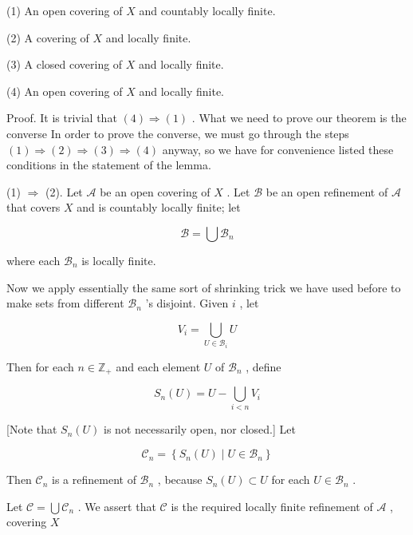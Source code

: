 (1) An open covering of \(X\) and countably locally finite.

(2) A covering of \(X\) and locally finite.

(3) A closed covering of \(X\) and locally finite.

(4) An open covering of \(X\) and locally finite.

Proof. It is trivial that \(\left( 4\right)  \Rightarrow  \left( 1\right)\) . What we need to prove our theorem is the converse In order to prove the converse, we must go through the steps \(\left( 1\right)  \Rightarrow  \left( 2\right)  \Rightarrow  \left( 3\right)  \Rightarrow  \left( 4\right)\) anyway, so we have for convenience listed these conditions in the statement of the lemma.

(1) \(\Rightarrow\) (2). Let \(\mathcal{A}\) be an open covering of \(X\) . Let \(\mathcal{B}\) be an open refinement of \(\mathcal{A}\) that covers \(X\) and is countably locally finite; let

\[
\mathcal{B} = \bigcup {\mathcal{B}}_{n}
\]

where each \({\mathcal{B}}_{n}\) is locally finite.

Now we apply essentially the same sort of shrinking trick we have used before to make sets from different \({\mathcal{B}}_{n}\) ’s disjoint. Given \(i\) , let

\[
{V}_{i} = \mathop{\bigcup }\limits_{{U \in  {\mathcal{B}}_{i}}}U
\]

Then for each \(n \in  {\mathbb{Z}}_{ + }\) and each element \(U\) of \({\mathcal{B}}_{n}\) , define

\[
{S}_{n}\left( U\right)  = U - \mathop{\bigcup }\limits_{{i < n}}{V}_{i}
\]

[Note that \({S}_{n}\left( U\right)\) is not necessarily open, nor closed.] Let

\[
{\mathcal{C}}_{n} = \left\{  {{S}_{n}\left( U\right)  \mid  U \in  {\mathcal{B}}_{n}}\right\}
\]

Then \({\mathcal{C}}_{n}\) is a refinement of \({\mathcal{B}}_{n}\) , because \({S}_{n}\left( U\right)  \subset  U\) for each \(U \in  {\mathcal{B}}_{n}\) .

Let \(\mathcal{C} = \bigcup {\mathcal{C}}_{n}\) . We assert that \(\mathcal{C}\) is the required locally finite refinement of \(\mathcal{A}\) , covering \(X\)

